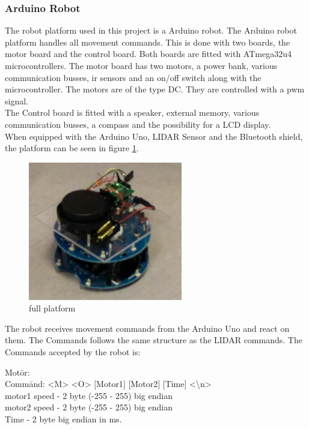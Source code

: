 \subsubsection{Arduino Robot}
The robot platform used in this project is a Arduino robot\cite{ArduinoRobot}. The Arduino robot platform handles all movement commands. This is done with two boards, the motor board and the control board. 
Both boards are fitted with ATmega32u4 microcontrollers. The motor board has two motors, a power bank, various communication busses, ir sensors and an on/off switch along with the microcontroller. 
The motors are of the type DC. They are controlled with a pwm signal.\\
The Control board is fitted with a speaker, external memory, various communication busses, a compass and the possibility for a LCD display.\\
When equipped with the Arduino Uno, LIDAR Sensor and the Bluetooth shield, the platform can be seen in figure \ref{fig:fullplatform}.
\begin{figure}[H]
\centering
\includegraphics[width=0.6\textwidth]{billeder/fullplatform}
\caption{full platform}
\label{fig:fullplatform}
\end{figure}

The robot receives movement commands from the Arduino Uno and react on them. The Commands follows the same structure as the LIDAR commands. The Commands accepted by the robot is: 

\begin{tabbing}	
{Mot}\={or:}\\
\> {Comm}\={and: <M> <O> $[$Motor1$]$ $[$Motor2$]$ $[$Time$]$ <\textbackslash n> } \\
\> \> motor1 speed - 2 byte (-255 - 255) big endian \\
\> \> motor2 speed - 2 byte (-255 - 255) big endian\\
\> \> Time   - 2 byte big endian in ms.
\end{tabbing}	



 
